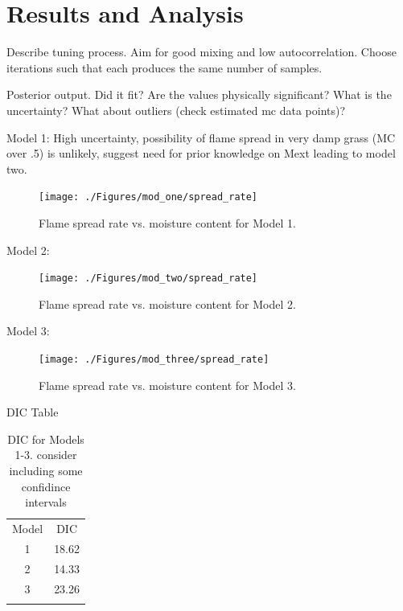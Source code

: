 \documentclass[11pt]{article}
\begin{document}
\section{Results and Analysis}
\label{sec:res}

Describe tuning process. Aim for good mixing and low autocorrelation. Choose iterations such that each produces the same number of samples.

Posterior output. Did it fit? Are the values physically significant? What is the uncertainty? What about outliers (check estimated mc data points)? 

Model 1: High uncertainty, possibility of flame spread in very damp grass (MC over .5) is unlikely, suggest need for prior knowledge on Mext leading to model two.

\begin{figure}[h]
\begin{center}
\texttt{[image: ./Figures/mod\_one/spread\_rate]}
\end{center}
\caption{Flame spread rate vs. moisture content for Model 1.}
\label{fig:m1_rate} 
\end{figure}

Model 2:

\begin{figure}[h]
\begin{center}
\texttt{[image: ./Figures/mod\_two/spread\_rate]}
\end{center}
\caption{Flame spread rate vs. moisture content for Model 2.}
\label{fig:m2_rate} 
\end{figure}

Model 3:

\begin{figure}[h]
\begin{center}
\texttt{[image: ./Figures/mod\_three/spread\_rate]}
\end{center}
\caption{Flame spread rate vs. moisture content for Model 3.}
\label{fig:m3_rate} 
\end{figure}

DIC Table

\begin{table}[h]
\caption{DIC for Models 1-3. consider including some confidince intervals}
\begin{center}
  \begin{tabular}{cc}
    \hline\noalign{\smallskip}
    Model & DIC \\
    \noalign{\smallskip}\hline\noalign{\smallskip}
    1 & 18.62 \\
    2 & 14.33 \\ 
    3 & 23.26 \\ 
    \noalign{\smallskip}\hline
  \end{tabular}
\end{center}
\label{tab:dic}
\end{table}
\end{document}
